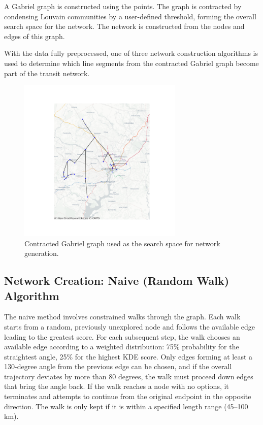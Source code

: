 \documentclass[manuscript,nonacm]{acmart}
\begin{document}
A Gabriel graph is constructed using the points. The graph is contracted by condensing Louvain communities by a user-defined threshold, forming the overall search space for the network. The network is constructed from the nodes and edges of this graph.

With the data fully preprocessed, one of three network construction algorithms is used to determine which line segments from the contracted Gabriel graph become part of the transit network.

\begin{figure}[h]
    \centering
    \includegraphics[width=0.7\textwidth]{img/network_map_contracted.png}
    \caption{Contracted Gabriel graph used as the search space for network generation.}
    \label{fig:contractedgraph}
\end{figure}

\subsection{Network Creation: Naive (Random Walk) Algorithm}

The naive method involves constrained walks through the graph. Each walk starts from a random, previously unexplored node and follows the available edge leading to the greatest score. For each subsequent step, the walk chooses an available edge according to a weighted distribution: 75\% probability for the straightest angle, 25\% for the highest KDE score. Only edges forming at least a 130-degree angle from the previous edge can be chosen, and if the overall trajectory deviates by more than 80 degrees, the walk must proceed down edges that bring the angle back. If the walk reaches a node with no options, it terminates and attempts to continue from the original endpoint in the opposite direction. The walk is only kept if it is within a specified length range (45--100 km).
\end{document}

